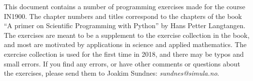 This document contains a number of programming exercises made for the course IN1900. The chapter numbers and titles correspond to the chapters of the book ``A primer on Scientific Programming with Python'' by Hans Petter Langtangen. 
The exercises are meant to be a supplement to the exercise collection in the book, and most are motivated by applications in science and applied mathematics. The exercise collection is used for the first time in 2018, and there may be typos and small errors. If you find any errors, or have other comments or questions about the exercises, please send them to Joakim Sundnes: \emph{sundnes@simula.no}.  
